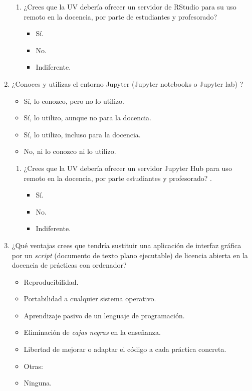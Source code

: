 \documentclass[a4paper,12pt]{article}
\begin{document}
\begin{enumerate}
\begin{enumerate}
   \item ¿Crees que la UV debería ofrecer un servidor de RStudio para su uso remoto en la docencia,
         por parte de estudiantes y profesorado?
      \begin{itemize}
      \item Sí.
      \item No.
      \item Indiferente.
      \end{itemize}
   \end{enumerate}

\item ¿Conoces y utilizas el entorno Jupyter (Jupyter notebooks o Jupyter lab) \cite{Barba2019}?
   \begin{itemize}
   \item Sí, lo conozco, pero no lo utilizo.
   \item Sí, lo utilizo, aunque no para la docencia.
   \item Sí, lo utilizo, incluso para la docencia.
   \item No, ni lo conozco ni lo utilizo.
   \end{itemize}

   \begin{enumerate}
   \item ¿Crees que la UV debería ofrecer un servidor Jupyter Hub para uso remoto en la docencia,
         por parte estudiantes y profesorado? \cite{JupyterHub}.
      \begin{itemize}
      \item Sí.
      \item No.
      \item Indiferente.
      \end{itemize}
   \end{enumerate}

\item ¿Qué ventajas crees que tendría sustituir una aplicación de interfaz gráfica por un \emph{script}
      (documento de texto plano ejecutable) de licencia abierta en la docencia de prácticas con ordenador?
   \begin{itemize}
   \item Reproducibilidad.
   \item Portabilidad a cualquier sistema operativo.
   \item Aprendizaje pasivo de un lenguaje de programación.
   \item Eliminación de \emph{cajas negras} en la enseñanza.
   \item Libertad de mejorar o adaptar el código a cada práctica concreta.
   \item Otras:
   \item Ninguna.
   \end{itemize}


\end{enumerate}
\end{document}
